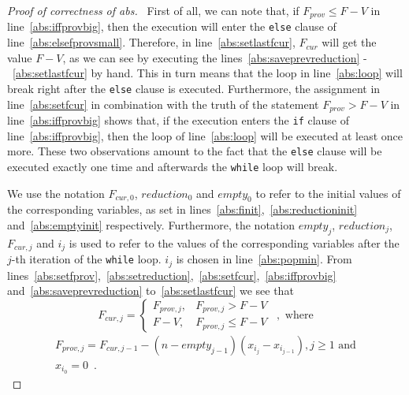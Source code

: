 \begin{proof}[Proof of correctness of abs] \
  First of all, we can note that, if $F_{prov} \leq F - V$ in line~\ref{abs:iffprovbig}, then the execution will enter the
  \texttt{else} clause of line~\ref{abs:elsefprovsmall}. Therefore, in line~\ref{abs:setlastfcur}, $F_{cur}$ will get the
  value $F - V$, as we can see by executing the lines~\ref{abs:saveprevreduction} -~\ref{abs:setlastfcur} by hand. This in
  turn means that the loop in line~\ref{abs:loop} will break right after the \texttt{else} clause is executed. Furthermore,
  the assignment in line~\ref{abs:setfcur} in combination with the truth of the statement $F_{prov} > F - V$ in
  line~\ref{abs:iffprovbig} shows that, if the execution enters the \texttt{if} clause of line~\ref{abs:iffprovbig}, then
  the loop of line~\ref{abs:loop} will be executed at least once more. These two observations amount to the fact that the
  \texttt{else} clause will be executed exactly one time and afterwards the \texttt{while} loop will break.

  We use the notation $F_{cur, 0}$, $reduction_0$ and $empty_0$ to refer to the initial values of the corresponding
  variables, as set in lines~\ref{abs:finit},~\ref{abs:reductioninit} and~\ref{abs:emptyinit} respectively. Furthermore, the
  notation $empty_j$, $reduction_j$, $F_{cur, j}$ and $i_j$ is used to refer to the values of the corresponding variables
  after the $j$-th iteration of the \texttt{while} loop. $i_j$ is chosen in line~\ref{abs:popmin}. From
  lines~\ref{abs:setfprov},~\ref{abs:setreduction},~\ref{abs:setfcur},~\ref{abs:iffprovbig} and~\ref{abs:saveprevreduction}
  to~\ref{abs:setlastfcur} we see that
  \begin{equation*}
    F_{cur, j} =
    \begin{cases}
       F_{prov, j},& F_{prov, j} > F - V \\
       F - V ,& F_{prov, j} \leq F - V
    \end{cases} \enspace, \mbox{ where}
  \end{equation*}
  \begin{equation*}
  \begin{gathered}
    F_{prov, j} = F_{cur, j-1} - (n - empty_{j-1})(x_{i_j} - x_{i_{j-1}}), j \geq 1 \mbox{ and} \\
    x_{i_0} = 0 \enspace.
  \end{gathered}
  \end{equation*}


\end{proof}
